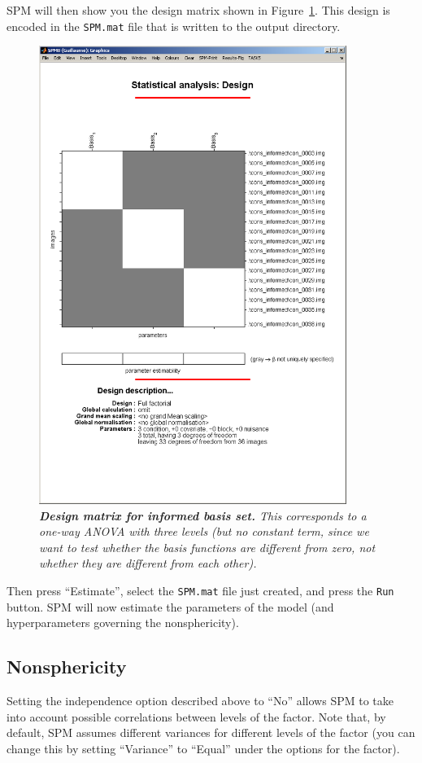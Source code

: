 SPM will then show you the design matrix shown in Figure~\ref{informed_design}. This design is encoded in the \texttt{SPM.mat} file that is written to the output directory.
\begin{figure}
\begin{center}
\includegraphics[width=100mm]{faces_group/informed_design}
\caption{\em \textbf{Design matrix for informed basis set.} This corresponds to a one-way ANOVA with three levels (but no constant term, since we want to test whether the basis functions are different from zero, not whether they are different from each other). \label{informed_design}}
\end{center}
\end{figure}
Then press ``Estimate'', select the \texttt{SPM.mat} file just created, and press the \texttt{Run} button.
SPM will now estimate the parameters of the model (and hyperparameters governing the nonsphericity).

\subsection{Nonsphericity}

Setting the independence option described above to ``No'' allows SPM to take into account possible correlations between levels of the factor. Note that, by default, SPM assumes different variances for different levels of the factor (you can change this by setting ``Variance'' to ``Equal'' under the options for the factor). 

